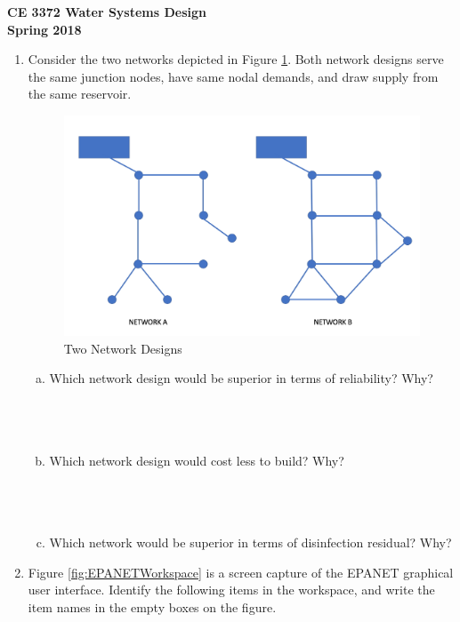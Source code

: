 \documentclass[11pt]{article}
\begin{document}
\begingroup
\begin{center}
{\textbf{{ CE 3372 Water Systems Design}  \\ Spring 2018} }
\end{center}
\endgroup

\begin{enumerate}
\item Consider the two networks depicted in Figure \ref{fig:TwoNetworks}.
Both network designs serve the same junction nodes, have same nodal demands, and draw supply from the same reservoir.
\begin{figure}[htbp] %
   \centering
   \includegraphics[width=5in]{TwoNetworks.jpg} 
   \caption{Two Network Designs}
   \label{fig:TwoNetworks}
\end{figure}
\begin{enumerate}[a)]
\item  Which network design would be superior in terms of reliability?   Why? \\~\\~\\~\\
\item Which network design would cost less to build?  Why? \\~\\~\\~\\
\item Which network would be superior in terms of disinfection residual? Why?
\end{enumerate}
\clearpage
\item Figure \ref{fig:EPANETWorkspace} is a screen capture of the EPANET graphical user interface.  Identify the following items in the workspace, and write the item names in the empty boxes on the figure.

\end{enumerate}
\end{document}
